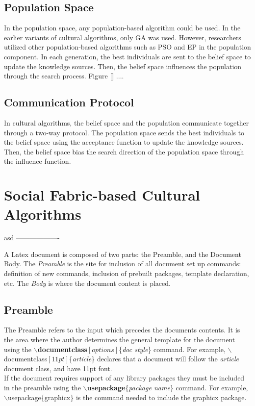 \subsection{Population Space}
In the population space, any population-based algorithm could be used. In the earlier variants of cultural algorithms, only GA was used. However, researchers utilized other population-based algorithms such as PSO and EP in the population component. In each generation, the best individuals are sent to the belief space to update the knowledge sources. Then, the belief space influences the population through the search process. Figure [] ....
\subsection{Communication Protocol}
In cultural algorithms, the belief space and the population communicate together through a two-way protocol. The population space sends the best individuals to the belief space using the acceptance function to update the knowledge sources. Then, the belief space bias the search direction of the population space through the influence function.
\section{Social Fabric-based Cultural Algorithms}
asd
\newline ------------------- \newline














A Latex document is composed of two parts: the Preamble, and the Document Body.  The \textit{Preamble} is the site for inclusion of all document set up commands: definition of new commands, inclusion of pre\-built packages, template declaration, etc.  The \textit{Body} is where the document content is placed.

\subsection{Preamble}
 The Preamble refers to the input which precedes the documents contents.  It is the area where the author determines the general template for the document using the \textbf{$\backslash$documentclass}$[options]$\{\textit{doc style}\} command.  For example,
 $\backslash$documentclass$[11pt]$\{\textit{article}\} declares that a document will follow the \textit{article} document class, and have 11pt font.
 \newline\\
 If the document requires support of any library packages they must be included in the preamble using the \textbf{$\backslash$usepackage}\{\textit{package name}\} command. For example, $\backslash$usepackage\{graphicx\} is the command needed to include the graphicx package.

